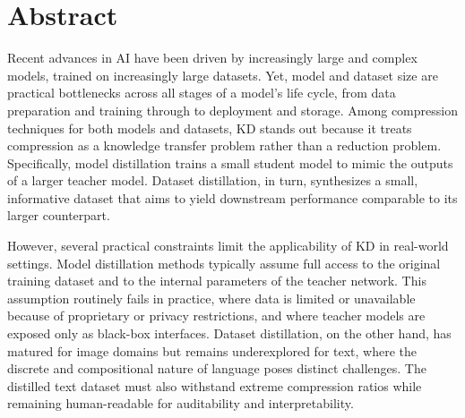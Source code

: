\chapter*{Abstract} \label{sec:03-abstract}

\begin{foldable}
  Recent advances in \acl{AI} have been driven by increasingly large and complex models, trained on increasingly large datasets.
  Yet, model and dataset size are practical bottlenecks across all stages of a model's life cycle, from data preparation and training through to deployment and storage.
  Among compression techniques for both models and datasets, \ac{KD} stands out because it treats compression as a knowledge transfer problem rather than a reduction problem.
  Specifically, model distillation trains a small student model to mimic the outputs of a larger teacher model.
  Dataset distillation, in turn, synthesizes a small, informative dataset that aims to yield downstream performance comparable to its larger counterpart.
\end{foldable}

\begin{foldable}
  However, several practical constraints limit the applicability of \ac{KD} in real-world settings.
  Model distillation methods typically assume full access to the original training dataset and to the internal parameters of the teacher network.
  This assumption routinely fails in practice, where data is limited or unavailable because of proprietary or privacy restrictions, and where teacher models are exposed only as black-box interfaces.
  Dataset distillation, on the other hand, has matured for image domains but remains underexplored for text, where the discrete and compositional nature of language poses distinct challenges.
  The distilled text dataset must also withstand extreme compression ratios while remaining human-readable for auditability and interpretability.
\end{foldable}

